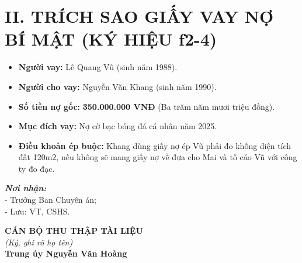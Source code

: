 \documentclass[12pt,a4paper]{article}
\begin{document}
\section*{II. TRÍCH SAO GIẤY VAY NỢ BÍ MẬT (KÝ HIỆU f2-4)}
\begin{itemize}[leftmargin=1.5cm]
    \item \textbf{Người vay:} Lê Quang Vũ (sinh năm 1988).
    \item \textbf{Người cho vay:} Nguyễn Văn Khang (sinh năm 1990).
    \item \textbf{Số tiền nợ gốc:} \textbf{350.000.000 VNĐ} (Ba trăm năm mươi triệu đồng).
    \item \textbf{Mục đích vay:} Nợ cờ bạc bóng đá cá nhân năm 2025.
    \item \textbf{Điều khoản ép buộc:} Khang dùng giấy nợ ép Vũ phải đo khống diện tích đất 120m2, nếu không sẽ mang giấy nợ về đưa cho Mai và tố cáo Vũ với công ty đo đạc.
\end{itemize}

\vspace{0.8cm}

\noindent
\begin{minipage}[t]{0.45\textwidth}
    \small
    \textbf{\textit{Nơi nhận:}}\\
    - Trưởng Ban Chuyên án;\\
    - Lưu: VT, CSHS.
\end{minipage}
\hfill
\begin{minipage}[t]{0.5\textwidth}
    \begin{center}
        \small
        \textbf{CÁN BỘ THU THẬP TÀI LIỆU}\\
        \textit{(Ký, ghi rõ họ tên)}\\[1.5cm]
        \textbf{Trung úy Nguyễn Văn Hoàng}
    \end{center}
\end{minipage}
\end{document}
